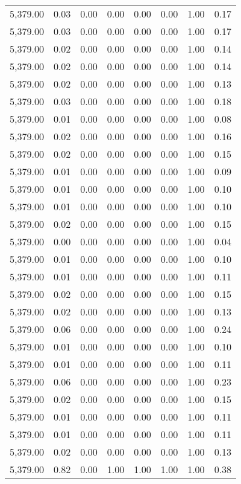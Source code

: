 \begin{longtable}{llllllll}
5,379.00 & 0.03 & 0.00 & 0.00 & 0.00 & 0.00 & 1.00 & 0.17 \\
5,379.00 & 0.03 & 0.00 & 0.00 & 0.00 & 0.00 & 1.00 & 0.17 \\
5,379.00 & 0.02 & 0.00 & 0.00 & 0.00 & 0.00 & 1.00 & 0.14 \\
5,379.00 & 0.02 & 0.00 & 0.00 & 0.00 & 0.00 & 1.00 & 0.14 \\
5,379.00 & 0.02 & 0.00 & 0.00 & 0.00 & 0.00 & 1.00 & 0.13 \\
5,379.00 & 0.03 & 0.00 & 0.00 & 0.00 & 0.00 & 1.00 & 0.18 \\
5,379.00 & 0.01 & 0.00 & 0.00 & 0.00 & 0.00 & 1.00 & 0.08 \\
5,379.00 & 0.02 & 0.00 & 0.00 & 0.00 & 0.00 & 1.00 & 0.16 \\
5,379.00 & 0.02 & 0.00 & 0.00 & 0.00 & 0.00 & 1.00 & 0.15 \\
5,379.00 & 0.01 & 0.00 & 0.00 & 0.00 & 0.00 & 1.00 & 0.09 \\
5,379.00 & 0.01 & 0.00 & 0.00 & 0.00 & 0.00 & 1.00 & 0.10 \\
5,379.00 & 0.01 & 0.00 & 0.00 & 0.00 & 0.00 & 1.00 & 0.10 \\
5,379.00 & 0.02 & 0.00 & 0.00 & 0.00 & 0.00 & 1.00 & 0.15 \\
5,379.00 & 0.00 & 0.00 & 0.00 & 0.00 & 0.00 & 1.00 & 0.04 \\
5,379.00 & 0.01 & 0.00 & 0.00 & 0.00 & 0.00 & 1.00 & 0.10 \\
5,379.00 & 0.01 & 0.00 & 0.00 & 0.00 & 0.00 & 1.00 & 0.11 \\
5,379.00 & 0.02 & 0.00 & 0.00 & 0.00 & 0.00 & 1.00 & 0.15 \\
5,379.00 & 0.02 & 0.00 & 0.00 & 0.00 & 0.00 & 1.00 & 0.13 \\
5,379.00 & 0.06 & 0.00 & 0.00 & 0.00 & 0.00 & 1.00 & 0.24 \\
5,379.00 & 0.01 & 0.00 & 0.00 & 0.00 & 0.00 & 1.00 & 0.10 \\
5,379.00 & 0.01 & 0.00 & 0.00 & 0.00 & 0.00 & 1.00 & 0.11 \\
5,379.00 & 0.06 & 0.00 & 0.00 & 0.00 & 0.00 & 1.00 & 0.23 \\
5,379.00 & 0.02 & 0.00 & 0.00 & 0.00 & 0.00 & 1.00 & 0.15 \\
5,379.00 & 0.01 & 0.00 & 0.00 & 0.00 & 0.00 & 1.00 & 0.11 \\
5,379.00 & 0.01 & 0.00 & 0.00 & 0.00 & 0.00 & 1.00 & 0.11 \\
5,379.00 & 0.02 & 0.00 & 0.00 & 0.00 & 0.00 & 1.00 & 0.13 \\
5,379.00 & 0.82 & 0.00 & 1.00 & 1.00 & 1.00 & 1.00 & 0.38 \\
\end{longtable}
